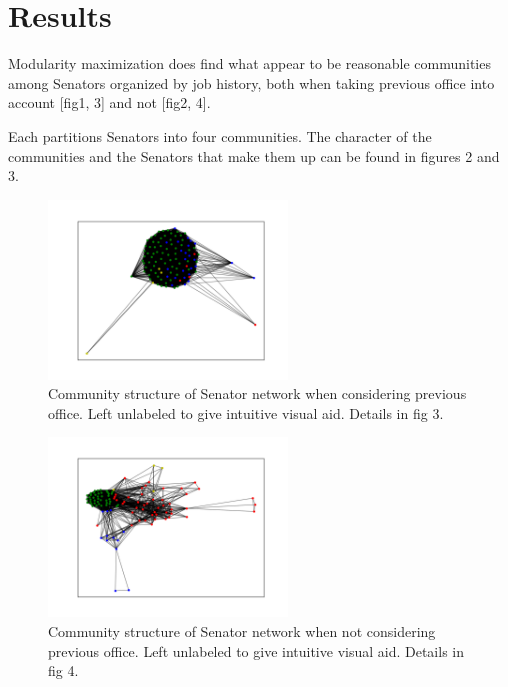 \documentclass[11pt,twocolumn]{article}
\begin{document}
	\section{Results}
Modularity maximization does find what appear to be reasonable communities among Senators organized by job history, both when taking previous office into account [fig1, 3] and not [fig2, 4].

Each partitions Senators into four communities. The character of the communities and the Senators that make them up can be found in figures 2 and 3.
	
\begin{figure}[H]
    \centering
    \includegraphics[width=2.5in]{comm_dis_w_office}
    \caption{{Community structure of Senator network when considering previous office. Left unlabeled to give intuitive visual aid. Details in fig 3.}}
    \label{fig:ds}
\end{figure}

\begin{figure}[H]
    \centering
    \includegraphics[width=2.5in]{comm_dis_no_office}
    \caption{{Community structure of Senator network when not considering previous office. Left unlabeled to give intuitive visual aid. Details in fig 4.}}
    \label{fig:ds}
\end{figure}
\end{document}
